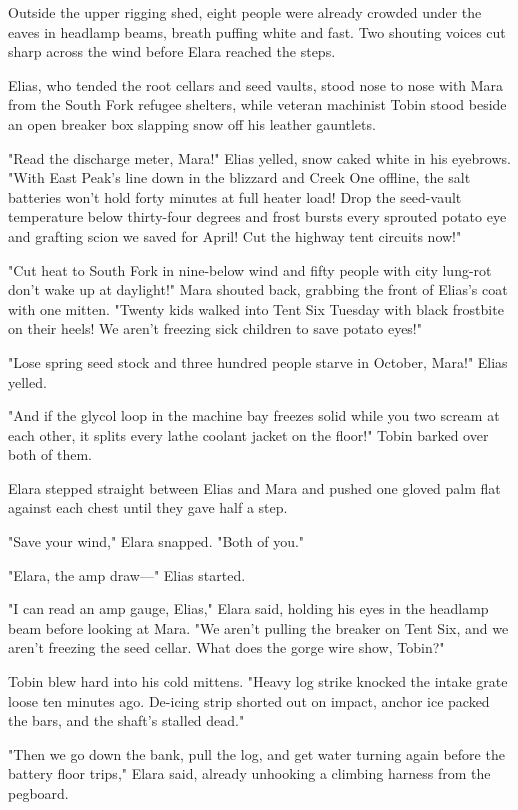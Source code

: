 Outside the upper rigging shed, eight people were already crowded under the eaves in headlamp beams, breath puffing white and fast. Two shouting voices cut sharp across the wind before Elara reached the steps.

Elias, who tended the root cellars and seed vaults, stood nose to nose with Mara from the South Fork refugee shelters, while veteran machinist Tobin stood beside an open breaker box slapping snow off his leather gauntlets.

"Read the discharge meter, Mara!" Elias yelled, snow caked white in his eyebrows. "With East Peak's line down in the blizzard and Creek One offline, the salt batteries won't hold forty minutes at full heater load! Drop the seed-vault temperature below thirty-four degrees and frost bursts every sprouted potato eye and grafting scion we saved for April! Cut the highway tent circuits now!"

"Cut heat to South Fork in nine-below wind and fifty people with city lung-rot don't wake up at daylight!" Mara shouted back, grabbing the front of Elias's coat with one mitten. "Twenty kids walked into Tent Six Tuesday with black frostbite on their heels! We aren't freezing sick children to save potato eyes!"

"Lose spring seed stock and three hundred people starve in October, Mara!" Elias yelled.

"And if the glycol loop in the machine bay freezes solid while you two scream at each other, it splits every lathe coolant jacket on the floor!" Tobin barked over both of them.

Elara stepped straight between Elias and Mara and pushed one gloved palm flat against each chest until they gave half a step.

"Save your wind," Elara snapped. "Both of you."

"Elara, the amp draw—" Elias started.

"I can read an amp gauge, Elias," Elara said, holding his eyes in the headlamp beam before looking at Mara. "We aren't pulling the breaker on Tent Six, and we aren't freezing the seed cellar. What does the gorge wire show, Tobin?"

Tobin blew hard into his cold mittens. "Heavy log strike knocked the intake grate loose ten minutes ago. De-icing strip shorted out on impact, anchor ice packed the bars, and the shaft's stalled dead."

"Then we go down the bank, pull the log, and get water turning again before the battery floor trips," Elara said, already unhooking a climbing harness from the pegboard.

